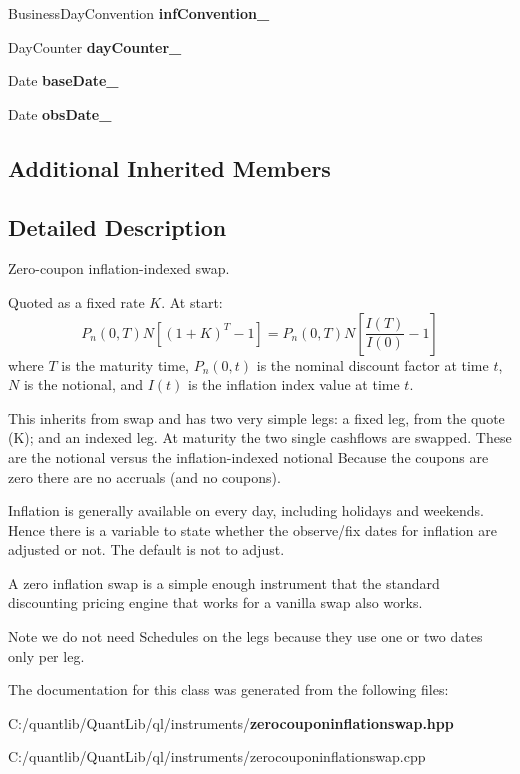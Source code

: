 \begin{DoxyCompactItemize}
\item 
Business\+Day\+Convention {\bfseries inf\+Convention\+\_\+}\label{class_quant_lib_1_1_zero_coupon_inflation_swap_ae78e02ae64d1d53e87f3ec268f341fe9}

\item 
Day\+Counter {\bfseries day\+Counter\+\_\+}\label{class_quant_lib_1_1_zero_coupon_inflation_swap_a76cbe18559431f469e1d7fe721a69f36}

\item 
Date {\bfseries base\+Date\+\_\+}\label{class_quant_lib_1_1_zero_coupon_inflation_swap_a2d0e11b0c9ae14b8a7a96c99fb045142}

\item 
Date {\bfseries obs\+Date\+\_\+}\label{class_quant_lib_1_1_zero_coupon_inflation_swap_ac1c10979ae6212701ef878a5ea6c61c9}

\end{DoxyCompactItemize}
\subsection*{Additional Inherited Members}


\subsection{Detailed Description}
Zero-\/coupon inflation-\/indexed swap. 

Quoted as a fixed rate $ K $. At start\+: \[ P_n(0,T) N [(1+K)^{T}-1] = P_n(0,T) N \left[ \frac{I(T)}{I(0)} -1 \right] \] where $ T $ is the maturity time, $ P_n(0,t) $ is the nominal discount factor at time $ t $, $ N $ is the notional, and $ I(t) $ is the inflation index value at time $ t $.

This inherits from swap and has two very simple legs\+: a fixed leg, from the quote (K); and an indexed leg. At maturity the two single cashflows are swapped. These are the notional versus the inflation-\/indexed notional Because the coupons are zero there are no accruals (and no coupons).

Inflation is generally available on every day, including holidays and weekends. Hence there is a variable to state whether the observe/fix dates for inflation are adjusted or not. The default is not to adjust.

A zero inflation swap is a simple enough instrument that the standard discounting pricing engine that works for a vanilla swap also works.

\begin{DoxyNote}{Note}
we do not need Schedules on the legs because they use one or two dates only per leg. 
\end{DoxyNote}


The documentation for this class was generated from the following files\+:\begin{DoxyCompactItemize}
\item 
C\+:/quantlib/\+Quant\+Lib/ql/instruments/{\bf zerocouponinflationswap.\+hpp}\item 
C\+:/quantlib/\+Quant\+Lib/ql/instruments/zerocouponinflationswap.\+cpp\end{DoxyCompactItemize}
